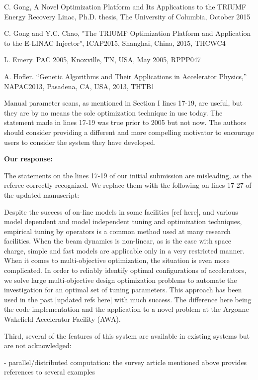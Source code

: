 \documentclass{article}
\begin{document}
C. Gong, A Novel Optimization Platform and Its Applications to the
TRIUMF Energy Recovery Linac, Ph.D. thesis, The University of
Columbia, October 2015

C. Gong and Y.C. Chao, "The TRIUMF Optimization Platform and
Application to the E-LINAC Injector", ICAP2015, Shanghai, China, 2015,
THCWC4

L. Emery. PAC 2005, Knoxville, TN, USA, May 2005, RPPP047

A. Hofler. “Genetic Algorithms and Their Applications in
Accelerator Physics,” NAPAC2013, Pasadena, CA, USA, 2013, THTB1

\vspace{1em}

Manual parameter scans, as mentioned in Section I lines 17-19, are
useful, but they are by no means the sole optimization technique in
use today. The statement made in lines 17-19 was true prior to 2005
but not now. The authors should consider providing a different and
more compelling motivator to encourage users to consider the system
they have developed.

{\bf Our response:} {\color{blue} The statements on the lines  17-19 of our initial submission are misleading, as
the referee correctly recognized. We replace them with the following on lines 17-27 of the updated manuscript:  

Despite the success of on-line models in some facilities [ref here], 
and various model dependent and model independent tuning and optimization techniques, 
empirical tuning by operators is a common method used at many research facilities.
When the beam dynamics is non-linear, as is the case with space charge, 
simple and fast models are applicable only in a very restricted manner. 
When it comes to multi-objective optimization, the situation is even more complicated.
In order to reliably identify optimal configurations of
accelerators, we solve large multi-objective design optimization
problems to automate the investigation for an optimal set of tuning parameters.
This approach has been used in the past [updated refs here] with much success.
The difference here being the code implementation and the application to a novel
problem at the Argonne Wakefield Accelerator Facility (AWA).
}

Third, several of the features of this system are available in
existing systems but are not acknowledged:

- parallel/distributed computation: the survey article mentioned above
provides references to several examples
\end{document}

